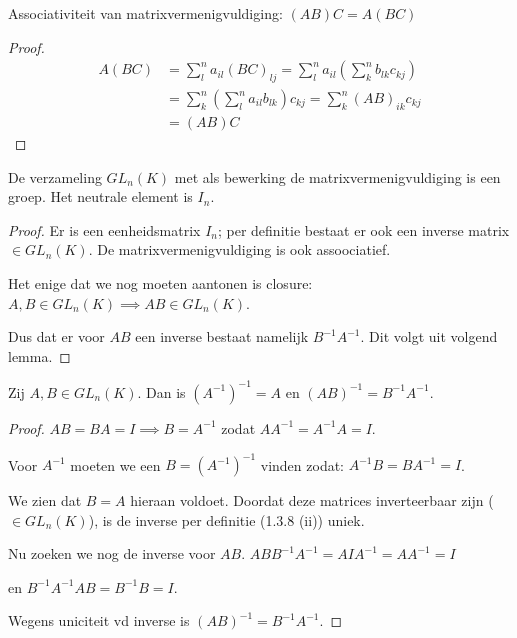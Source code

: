 \begin{lemma}
    Associativiteit van matrixvermenigvuldiging: \((AB)C = A(BC)\)
\end{lemma}
\begin{proof}
    \begin{align*}
        A(BC) &= \sum_{l}^{n} a_{il}\left(BC\right)_{lj} 
        = \sum_{l}^{n} a_{il} \left(\sum_{k}^n b_{lk}c_{kj}\right)  \\
        &= \sum_{k}^n \left(  \sum_{l}^{n} a_{il}  b_{lk} \right) c_{kj}
        = \sum_{k}^n  \left( AB \right)_{ik} c_{kj} \\
        &= (AB)C
    \end{align*}
\end{proof}

\begin{lemma}
    De verzameling \(GL_n(K)\) met als bewerking de matrixvermenigvuldiging is een groep.
    Het neutrale element is \(I_n\).
\end{lemma}
\begin{proof}
    Er is een eenheidsmatrix \(I_n\);
    per definitie bestaat er ook een inverse matrix \(\in GL_n(K)\). 
    De matrixvermenigvuldiging is ook assoociatief.

    Het enige dat we nog moeten aantonen is closure:
    \(A,B \in GL_n(K) \implies AB \in GL_n(K)\).

    Dus dat er voor \( AB\) een inverse bestaat namelijk \(B^{-1}A^{-1}\).
    Dit volgt uit volgend lemma.

\end{proof}

\begin{lemma}
    Zij \(A, B \in GL_n (K)\). Dan is \((A^{-1})^{-1} = A \) en \((AB)^{-1} = B^{-1}A^{-1}\).
\end{lemma}
\begin{proof}
    \(AB = BA = I \implies B = A^{-1}\)
    zodat \(AA^{-1} = A^{-1}A = I\).

    Voor \(A^{-1}\) moeten we een \(B = (A^{-1})^{-1}\) vinden zodat:
    \(A^{-1} B = B A^{-1} = I\). 

    We zien dat \(B = A\) hieraan voldoet. Doordat deze matrices inverteerbaar zijn (\(\in GL_n(K)\)), 
    is de inverse per definitie (1.3.8 (ii)) uniek.

    Nu zoeken we nog de inverse voor \(AB\).
    \(ABB^{-1}A^{-1} = AIA^{-1} = AA^{-1} = I\)

    en
    \(B^{-1}A^{-1}AB = B^{-1}B = I\).

    Wegens uniciteit vd inverse is \((AB)^{-1} = B^{-1}A^{-1}\).

\end{proof}

